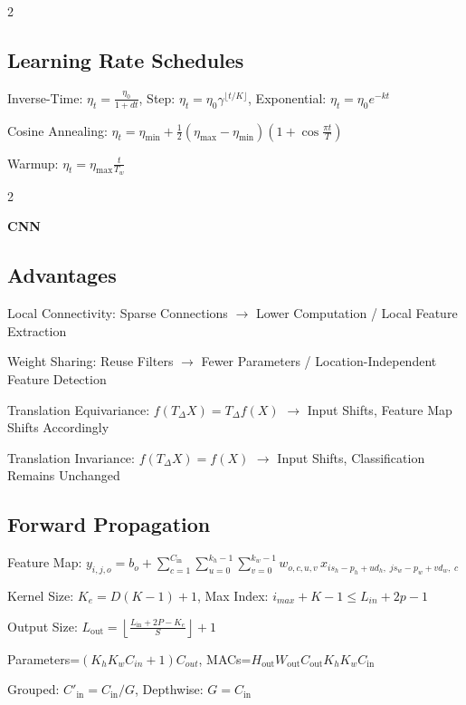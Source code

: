 \documentclass[a4paper]{article}
\newcommand{\module}[1]{\par\needspace{45pt}\addvspace{4pt}\noindent\colorbox{accent}{\parbox{\dimexpr\linewidth-2\fboxsep\relax}{\color{white}\sffamily\bfseries\fontsize{10}{12}\selectfont #1}}\par\vspace{1pt}}
\newcommand{\pagetwostyle}{\fontsize{7.2}{9}\selectfont\raggedcolumns}
\let\originalsum\sum
\renewcommand{\sum}{\mathop{\textstyle\originalsum}\nolimits}
\begin{document}
\begin{multicols}{2}
\subsection*{Learning Rate Schedules}
\noindent Inverse-Time: \(\displaystyle \eta_t=\frac{\eta_0}{1+dt}\), Step: \(\displaystyle \eta_t=\eta_0\gamma^{\lfloor t/K\rfloor}\), Exponential: \(\displaystyle \eta_t=\eta_0e^{-kt}\)\par
\noindent Cosine Annealing: \(\displaystyle \eta_t=\eta_{\min}+\frac12(\eta_{\max}-\eta_{\min}) \left(1+\cos\frac{\pi t}{T}\right)\)\par
\noindent Warmup: \(\displaystyle \eta_t=\eta_{\mathrm{max}}\frac{t}{T_w}\)\par
\end{multicols}\newpage\pagetwostyle\begin{multicols}{2}
\module{CNN}
\subsection*{Advantages}
\noindent Local Connectivity: Sparse Connections \(\to\) Lower Computation / Local Feature Extraction\par
\noindent Weight Sharing: Reuse Filters \(\to\) Fewer Parameters / Location-Independent Feature Detection\par
\noindent Translation Equivariance: \(\displaystyle f(T_\Delta X)=T_\Delta f(X)\) \(\to\) Input Shifts, Feature Map Shifts Accordingly\par
\noindent Translation Invariance: \(\displaystyle f(T_\Delta X)=f(X)\) \(\to\) Input Shifts, Classification Remains Unchanged\par
\subsection*{Forward Propagation}
\noindent Feature Map: \(\displaystyle y_{i,j,o} = b_o+ \sum_{c=1}^{C_{\mathrm{in}}} \sum_{u=0}^{k_h-1} \sum_{v=0}^{k_w-1} w_{o,c,u,v}\, x_{is_h-p_h+ud_h,\;js_w-p_w+vd_w,\;c}\)\par
\noindent Kernel Size: \(\displaystyle K_{e} = D(K-1) + 1\), Max Index: \(\displaystyle i_{max} + K - 1 \leq L_{in} + 2p -1\)\par
\noindent Output Size: \(\displaystyle L_{\mathrm{out}} = \left\lfloor \frac{L_{\mathrm{in}}+2P-K_e}{S} \right\rfloor+1\)\par
\noindent Parameters=\(\displaystyle \left(K_hK_wC_{in}+1\right)C_{out}\), MACs=\(\displaystyle H_{\text{out}}W_{\text{out}}C_{\text{out}}K_hK_wC_{\text{in}}\)\par
\noindent Grouped: \(\displaystyle C'_\text{in} = C_\text{in} / G\), Depthwise: \(\displaystyle G = C_\text{in}\)\par

\end{multicols}
\end{document}
